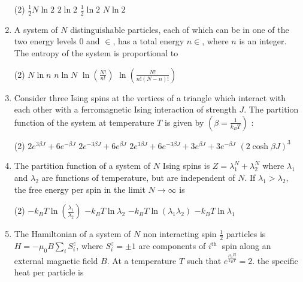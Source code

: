 \begin{enumerate}
{	}
 \begin{tasks}(2)
	\task[\textbf{a.}]$\frac{1}{2} N \ln 2$
	\task[\textbf{b.}] $2 \ln 2$
	\task[\textbf{c.}]$\frac{1}{2} \ln 2$
	\task[\textbf{d.}] $N \ln 2$	
\end{tasks}	
	\item A system of $N$ distinguishable particles, each of which can be in one of the two energy levels 0 and $\in$, has a total energy $n \in$, where $n$ is an integer. The entropy of the system is proportional to
	{	}
	 \begin{tasks}(2)
		\task[\textbf{a.}]$N \ln n$
		\task[\textbf{b.}]$n \ln N$
		\task[\textbf{c.}] $\ln \left(\frac{N !}{n !}\right)$
		\task[\textbf{d.}] $\ln \left(\frac{N !}{n !(N-n) !}\right)$
	\end{tasks}
\item Consider three Ising spins at the vertices of a triangle which interact with each other with a ferromagnetic Ising interaction of strength $J$. The partition function of the system at temperature $T$ is given by $\left(\beta=\frac{1}{k_{B} T}\right)$ :
{	}
 \begin{tasks}(2)
	\task[\textbf{a.}] $2 e^{3 \beta J}+6 e^{-\beta J}$
	\task[\textbf{b.}] $2 e^{-3 \beta J}+6 e^{\beta J}$
	\task[\textbf{c.}]$2 e^{3 \beta J}+6 e^{-3 \beta J}+3 e^{\beta J}+3 e^{-\beta J}$
	\task[\textbf{d.}] $(2 \cosh \beta J)^{3}$
\end{tasks}
\item The partition function of a system of $N$ Ising spins is $Z=\lambda_{1}^{N}+\lambda_{2}^{N}$ where $\lambda_{1}$ and $\lambda_{2}$ are functions of temperature, but are independent of $N$. If $\lambda_{1}>\lambda_{2}$, the free energy per spin in the limit $N \rightarrow \infty$ is
{	}
 \begin{tasks}(2)
	\task[\textbf{a.}]$-k_{B} T \ln \left(\frac{\lambda_{1}}{\lambda_{2}}\right)$
	\task[\textbf{b.}] $-k_{B} T \ln \lambda_{2}$
	\task[\textbf{c.}]$-k_{B} T \ln \left(\lambda_{1} \lambda_{2}\right)$
	\task[\textbf{d.}] $-k_{B} T \ln \lambda_{1}$
\end{tasks}
\item The Hamiltonian of a system of $N$ non interacting spin $\frac{1}{2}$ particles is $H=-\mu_{0} B \sum_{i} S_{i}^{z}$, where $S_{i}^{z}=\pm 1$ are components of $i^{\text {th }}$ spin along an external magnetic field $B$. At a temperature $T$ such that $e^{\frac{\mu_{0} B}{k_{B} T}}=2$. the specific heat per particle is

\end{enumerate}
